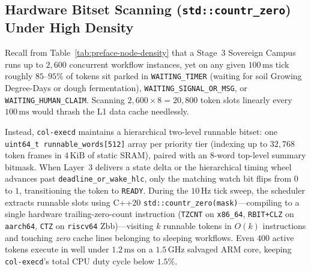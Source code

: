 \subsection{Hardware Bitset Scanning (\texttt{std::countr\_zero}) Under High Density}

Recall from Table~\ref{tab:preface-node-density} that a Stage~3 Sovereign Campus runs up to
$2{,}600$ concurrent workflow instances, yet on any given $100\,\mathrm{ms}$ tick roughly
$85\text{--}95\%$ of tokens sit parked in \texttt{WAITING\_TIMER} (waiting for soil Growing
Degree-Days or dough fermentation), \texttt{WAITING\_SIGNAL\_OR\_MSG}, or
\texttt{WAITING\_HUMAN\_CLAIM}. Scanning $2{,}600 \times 8 = 20{,}800$ token slots linearly
every $100\,\mathrm{ms}$ would thrash the L1 data cache needlessly.

Instead, \texttt{col-execd} maintains a hierarchical two-level runnable bitset: one
\texttt{uint64\_t runnable\_words[512]} array per priority tier (indexing up to $32{,}768$
token frames in $4\,\mathrm{KiB}$ of static SRAM), paired with an 8-word top-level summary
bitmask. When Layer~3 delivers a state delta or the hierarchical timing wheel advances past
\texttt{deadline\_or\_wake\_hlc}, only the matching watch bit flips from $0$ to $1$,
transitioning the token to \texttt{READY}. During the $10\,\mathrm{Hz}$ tick sweep, the
scheduler extracts runnable slots using C++20 \texttt{std::countr\_zero(mask)}---compiling
to a single hardware trailing-zero-count instruction (\texttt{TZCNT} on \texttt{x86\_64},
\texttt{RBIT+CLZ} on \texttt{aarch64}, \texttt{CTZ} on \texttt{riscv64} Zbb)---visiting $k$
runnable tokens in $O(k)$ instructions and touching \textit{zero} cache lines belonging to
sleeping workflows. Even $400$ active tokens execute in well under $1.2\,\mathrm{ms}$ on a
$1.5\,\mathrm{GHz}$ salvaged ARM core, keeping \texttt{col-execd}'s total CPU duty cycle
below $1.5\%$.

